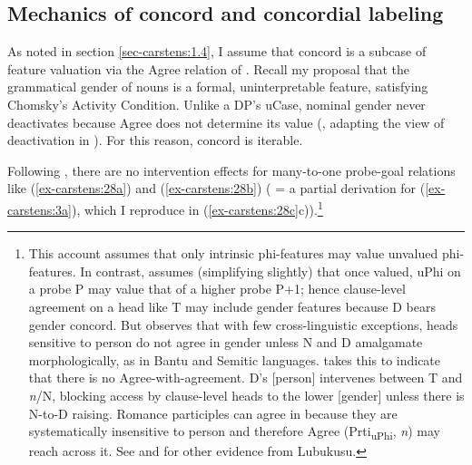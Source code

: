 \documentclass[output=paper
,modfonts
,nonflat]{langsci/langscibook}
\begin{document}
\subsection{Mechanics of concord and concordial labeling} \label{sec-carstens:3.2}
As noted in section \ref{sec-carstens:1.4}, I assume that concord is a subcase of feature valuation via the Agree relation of \citealt{Chomsky2000, Chomsky2001}. Recall my proposal that the grammatical gender of nouns is a formal, uninterpretable feature, satisfying Chomsky's Activity Condition. Unlike a DP's uCase, nominal gender never deactivates because Agree does not determine its value (\citealt{Carstens2010, Carstens2011}, adapting the view of deactivation in \citealt{Nevins2005}). For this reason, concord is iterable. 

Following \citet{Hiraiwa2001}, there are no intervention effects for many-to-one probe-goal relations like (\ref{ex-carstens:28a}) and (\ref{ex-carstens:28b}) ( = a partial derivation for (\ref{ex-carstens:3a}), which I reproduce in (\ref{ex-carstens:28c}c)).\footnote{\label{note13}This account assumes that only intrinsic phi-features may value unvalued phi-features. In contrast, \citet{Danon2011} assumes (simplifying slightly) that once valued, uPhi on a probe P may value that of a higher probe P+1; hence clause-level agreement on a head like T may include gender features because D bears gender concord. But \citet{Carstens2011} observes that with few cross-linguistic exceptions, heads sensitive to person do not agree in gender unless N and D amalgamate morphologically, as in Bantu and Semitic languages. \citet{Carstens2011} takes this to indicate that there is no Agree-with-agreement. D’s [person] intervenes between T and \textit{n}/N, blocking access by clause-level heads to the lower [gender] unless there is N-to-D raising. Romance participles can agree in because they are systematically insensitive to person and therefore Agree (Prti\textsubscript{uPhi}, \textit{n}) may reach across it. See \citealt{Carstens_Diercks2013} and \citealt{Wasike2007} for other evidence from Lubukusu.} 
\end{document}
